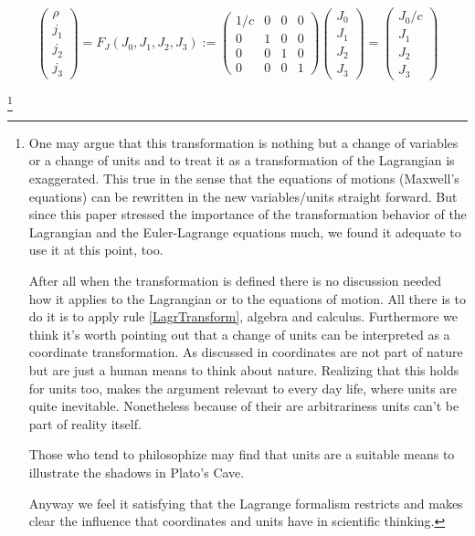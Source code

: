 \documentclass{article}
\begin{document}
\begin{equation} \label{currentTransformClassical}
    \left(\begin{array}{c}
              \rho
              \\
              j_1
              \\
              j_2
              \\
              j_3
    \end{array} \right)
    = F_J (J_0,J_1,J_2,J_3)
    :=
    \begin{pmatrix}
        1/c & 0 & 0 & 0
        \\
        0 & 1 & 0 & 0
        \\
        0 & 0 & 1 & 0
        \\
        0 & 0 & 0 & 1
    \end{pmatrix}
    \left(\begin{array}{c}
              J_0
              \\
              J_1
              \\
              J_2
              \\
              J_3
    \end{array} \right)
    =
    \left(\begin{array}{c}
              J_0/c
              \\
              J_1
              \\
              J_2
              \\
              J_3
    \end{array} \right)
\end{equation}


\footnote{
One may argue that this transformation is nothing but a change of variables or a change of units and to treat it as a transformation of the Lagrangian is exaggerated.
This true in the sense that the equations of motions (Maxwell's equations) can be rewritten in the new variables/units straight forward.
But since this paper stressed the importance of the transformation behavior of the Lagrangian and the Euler-Lagrange equations much, we found it adequate to use it at this point, too.

After all when the transformation is defined there is no discussion needed how it applies to the Lagrangian or to the equations of motion.
All there is to do it is to apply rule \ref{LagrTransform}, algebra and calculus.
Furthermore we think it's worth pointing out that a change of units can be interpreted as a coordinate transformation.
As discussed in \cite{WagnerGuthrie} coordinates are not part of nature but are just a human means  to think about nature.
Realizing that this holds for units too, makes the argument relevant to every day life, where units are quite inevitable.
Nonetheless because of their are arbitrariness units can't be part of reality itself.

Those who tend to philosophize may find that units are a suitable means to illustrate the shadows in Plato's Cave.

Anyway we feel it satisfying that the Lagrange formalism restricts and makes clear the influence that coordinates and units have in scientific thinking.
} %
\end{document}
